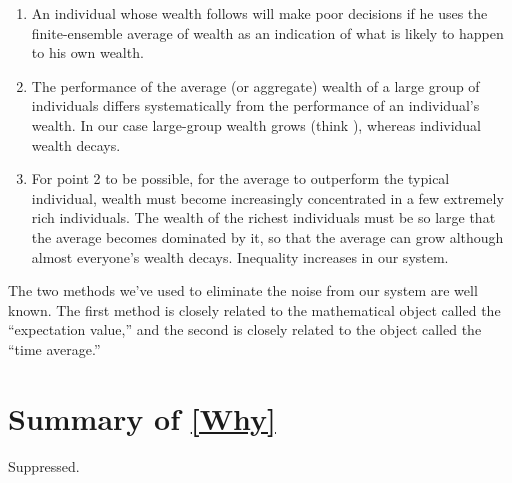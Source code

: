 \begin{enumerate}
\item
An individual whose wealth follows  will make poor decisions if he uses the 
finite-ensemble average of wealth as an indication of what is likely to happen to his own wealth.
\item
The performance of the average (or aggregate) wealth of a large group of individuals differs systematically from 
the performance of an individual's wealth. In our case large-group wealth grows (think \GDP), whereas 
individual wealth decays.
\item
For point 2 to be possible, \ie for the average to outperform the typical individual, wealth must 
become increasingly concentrated in a 
few extremely rich individuals. The wealth of the richest individuals must be so large that the average becomes 
dominated by it, so that the average can grow although almost everyone's wealth decays. Inequality 
increases in our system.
\end{enumerate}

The two methods we've used to eliminate the noise from our system
are well known. The first method is closely related to the mathematical object called the
``expectation value,'' and the second is closely related to the object called the ``time average.''

\section*{Summary of \cref{Why}}
Suppressed.
%
%
